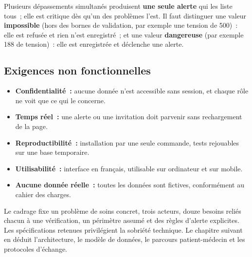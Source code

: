 Plusieurs dépassements simultanés produisent \textbf{une seule alerte} qui les liste tous~; elle est critique dès qu'un des problèmes l'est. Il faut distinguer une valeur \textbf{impossible} (hors des bornes de validation, par exemple une tension de 500)~: elle est refusée et rien n'est enregistré~; et une valeur \textbf{dangereuse} (par exemple 188 de tension)~: elle est enregistrée et déclenche une alerte.

\subsection{Exigences non fonctionnelles}

\begin{itemize}
  \item \textbf{Confidentialité~:} aucune donnée n'est accessible sans session, et chaque rôle ne voit que ce qui le concerne.
  \item \textbf{Temps réel~:} une alerte ou une invitation doit parvenir sans rechargement de la page.
  \item \textbf{Reproductibilité~:} installation par une seule commande, tests rejouables sur une base temporaire.
  \item \textbf{Utilisabilité~:} interface en français, utilisable sur ordinateur et sur mobile.
  \item \textbf{Aucune donnée réelle~:} toutes les données sont fictives, conformément au cahier des charges.
\end{itemize}

\conclchap

Le cadrage fixe un problème de soins concret, trois acteurs, douze besoins reliés chacun à une vérification, un périmètre assumé et des règles d'alerte explicites. Les spécifications retenues privilégient la sobriété technique. Le chapitre suivant en déduit l'architecture, le modèle de données, le parcours patient-médecin et les protocoles d'échange.
